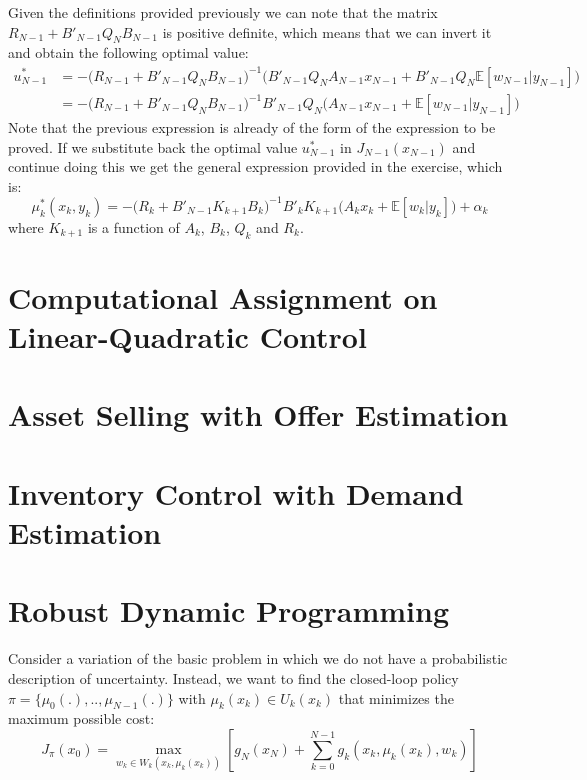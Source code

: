 \documentclass[11pt, oneside]{article}   	%
\begin{document}
Given the definitions provided previously we can note that the matrix $R_{N-1} + B'_{N-1}Q_{N}B_{N-1}$ is positive definite, which means that we can invert it and obtain the following optimal value:
\begin{align*}
u_{N-1}^{*} &= - \big(R_{N-1} + B'_{N-1}Q_{N}B_{N-1}\big)^{-1}\big(B'_{N-1}Q_{N}A_{N-1}x_{N-1} + B'_{N-1}Q_{N} \mathbb{E}[w_{N-1}|y_{N-1}]\big)\\
&= - \big(R_{N-1} + B'_{N-1}Q_{N}B_{N-1}\big)^{-1}B'_{N-1}Q_{N}\big(A_{N-1}x_{N-1} +\mathbb{E}[w_{N-1}|y_{N-1}]\big)
\end{align*}
Note that the previous expression is already of the form of the expression to be proved. If we substitute back the optimal value $u_{N-1}^{*}$ in $J_{N-1}(x_{N-1})$ and continue doing this we get the general expression provided in the exercise, which is:
$$\mu_{k}^{*}(x_{k},y_{k}) = - \big(R_{k} + B'_{N-1}K_{k+1}B_{k}\big)^{-1}B'_{k}K_{k+1}\big(A_{k}x_{k} + \mathbb{E}[w_{k}|y_{k}]\big) + \alpha_{k}$$
where $K_{k+1}$ is a function of $A_{k}$, $B_{k}$, $Q_{k}$ and $R_{k}$.

\section{Computational Assignment on Linear-Quadratic Control}


\section{Asset Selling with Offer Estimation}


\section{Inventory Control with Demand Estimation}


\section{Robust Dynamic Programming}
Consider a variation of the basic problem in which we do not have a probabilistic description of uncertainty. Instead, we want to find the closed-loop policy $\pi = \{\mu_0(.),..,\mu_{N-1}(.)\}$ with $\mu_k(x_k) \in U_k(x_k)$ that minimizes the maximum possible cost:
$$
J_{\pi}(x_0) = \max_{w_k \in W_k(x_k,\mu_k(x_k))} \left[ g_N(x_N) + \sum_{k=0}^{N-1} g_k(x_k,\mu_k(x_k), w_k)\right]
$$
\end{document}
